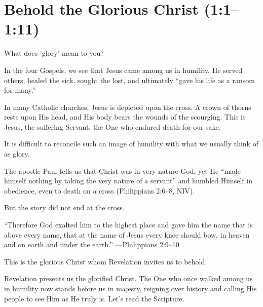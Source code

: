 \chapter{Behold the Glorious Christ (1:1--1:11)}

What does 'glory' mean to you?

In the four Gospels, we see that Jesus came among us in humility. He served others, healed the sick, sought the lost, and ultimately ``gave his life as a ransom for many.''

In many Catholic churches, Jesus is depicted upon the cross. A crown of thorns rests upon His head, and His body bears the wounds of the scourging. This is Jesus, the suffering Servant, the One who endured death for our sake. 

It is difficult to reconcile such an image of humility with what we usually think of as glory.

The apostle Paul tells us that Christ was in very nature God, yet He ``made himself nothing by taking the very nature of a servant'' and humbled Himself in obedience, even to death on a cross (Philippians 2:6--8, NIV).

But the story did not end at the cross.

``Therefore God exalted him to the highest place and gave him the name that is above every name, that at the name of Jesus every knee should bow, in heaven and on earth and under the earth.''
---Philippians 2:9--10  

This is the glorious Christ whom Revelation invites us to behold.

Revelation presents us the glorified Christ. The One who once walked among us in humility now stands before us in majesty, reigning over history and calling His people to see Him as He truly is. Let's read the Scripture.

